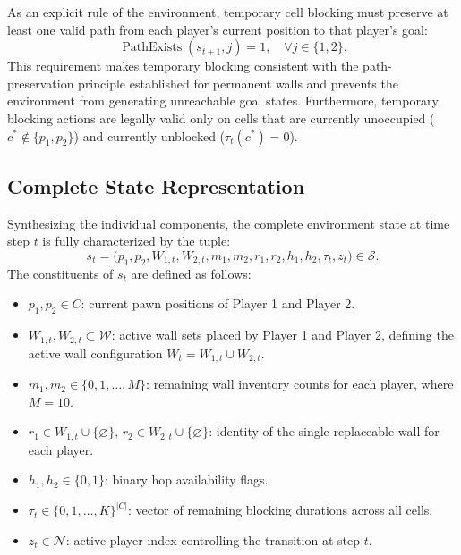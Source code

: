 \documentclass{article}
\begin{document}
As an explicit rule of the environment, temporary cell blocking must preserve at least one valid path from each player's current position to that player's goal:
\begin{equation}
\operatorname{PathExists}(s_{t+1}, j) = 1, \quad \forall j \in \{1, 2\}.
\end{equation}
This requirement makes temporary blocking consistent with the path-preservation principle established for permanent walls and prevents the environment from generating unreachable goal states. Furthermore, temporary blocking actions are legally valid only on cells that are currently unoccupied ($c^* \notin \{p_1, p_2\}$) and currently unblocked ($\tau_t(c^*) = 0$).

\subsection{Complete State Representation}
\label{subsec:complete_state}

Synthesizing the individual components, the complete environment state at time step $t$ is fully characterized by the tuple:
\begin{equation}
s_t = \big( p_1, p_2, W_{1,t}, W_{2,t}, m_1, m_2, r_1, r_2, h_1, h_2, \tau_t, z_t \big) \in \mathcal{S}.
\end{equation}
The constituents of $s_t$ are defined as follows:
\begin{itemize}
    \item $p_1, p_2 \in C$: current pawn positions of Player 1 and Player 2.
    \item $W_{1,t}, W_{2,t} \subset \mathcal{W}$: active wall sets placed by Player 1 and Player 2, defining the active wall configuration $W_t = W_{1,t} \cup W_{2,t}$.
    \item $m_1, m_2 \in \{0, 1, \dots, M\}$: remaining wall inventory counts for each player, where $M = 10$.
    \item $r_1 \in W_{1,t} \cup \{\varnothing\}, \, r_2 \in W_{2,t} \cup \{\varnothing\}$: identity of the single replaceable wall for each player.
    \item $h_1, h_2 \in \{0, 1\}$: binary hop availability flags.
    \item $\tau_t \in \{0, 1, \dots, K\}^{|C|}$: vector of remaining blocking durations across all cells.
    \item $z_t \in \mathcal{N}$: active player index controlling the transition at step $t$.
\end{itemize}
\end{document}
